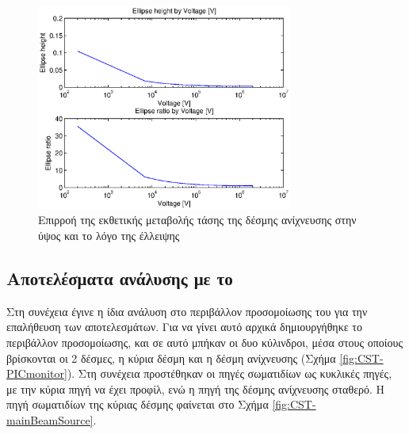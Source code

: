 \begin{figure}[tbh]
\includegraphics[width=0.75\textwidth]{figures/beam_deflection_script_07}
\centering
\caption{Επιρροή της εκθετικής μεταβολής τάσης της δέσμης ανίχνευσης στην ύψος και το λόγο της έλλειψης}
\label{fig:beam_deflection_script_07}
\end{figure}

\subsection{Αποτελέσματα ανάλυσης με το }

Στη συνέχεια έγινε η ίδια ανάλυση στο περιβάλλον προσομοίωσης του  για την επαλήθευση των αποτελεσμάτων. 
Για να γίνει αυτό αρχικά δημιουργήθηκε το περιβάλλον προσομοίωσης, και σε αυτό μπήκαν οι  δυο κύλινδροι, μέσα στους οποίους βρίσκονται οι 2 δέσμες, η κύρια δέσμη και η δέσμη ανίχνευσης (Σχήμα \ref{fig:CST-PICmonitor}). 
Στη συνέχεια προστέθηκαν οι πηγές σωματιδίων ως κυκλικές πηγές, με την κύρια πηγή να έχει  προφίλ, ενώ η πηγή της δέσμης ανίχνευσης σταθερό. 
Η πηγή σωματιδίων της κύριας δέσμης φαίνεται στο Σχήμα \ref{fig:CST-mainBeamSource}.

